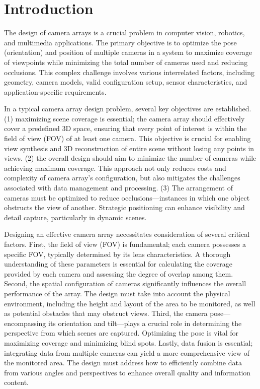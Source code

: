 \section{Introduction}
The design of camera arrays is a crucial problem in computer vision, robotics, and multimedia applications. The primary objective is to optimize the pose (orientation) and position of multiple cameras in a system to maximize coverage of viewpoints while minimizing the total number of cameras used and reducing occlusions. This complex challenge involves various interrelated factors, including geometry, camera models, valid configuration setup, sensor characteristics, and application-specific requirements.

In a typical camera array design problem, several key objectives are established. (1) maximizing scene coverage is essential; the camera array should effectively cover a predefined 3D space, ensuring that every point of interest is within the field of view (FOV) of at least one camera. This objective is crucial for enabling view synthesis and 3D reconstruction of entire scene without losing any points in views. (2) the overall design should aim to minimize the number of cameras while achieving maximum coverage. This approach not only reduces costs and complexity of camera array's configuration, but also mitigates the challenges associated with data management and processing. (3) The arrangement of cameras must be optimized to reduce occlusions—instances in which one object obstructs the view of another. Strategic positioning can enhance visibility and detail capture, particularly in dynamic scenes.

Designing an effective camera array necessitates consideration of several critical factors.
First, the field of view (FOV) is fundamental; each camera possesses a specific FOV, typically determined by its lens characteristics. A thorough understanding of these parameters is essential for calculating the coverage provided by each camera and assessing the degree of overlap among them.
Second, the spatial configuration of cameras significantly influences the overall performance of the array. The design must take into account the physical environment, including the height and layout of the area to be monitored, as well as potential obstacles that may obstruct views.
Third, the camera pose—encompassing its orientation and tilt—plays a crucial role in determining the perspective from which scenes are captured. Optimizing the pose is vital for maximizing coverage and minimizing blind spots.
Lastly, data fusion is essential; integrating data from multiple cameras can yield a more comprehensive view of the monitored area. The design must address how to efficiently combine data from various angles and perspectives to enhance overall quality and information content.


